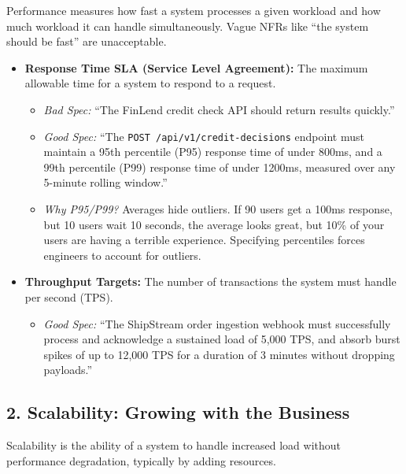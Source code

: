 \documentclass[
  11pt,
  openany,
  oneside]{book}
\providecommand{\tightlist}{%
  \setlength{\itemsep}{0pt}\setlength{\parskip}{0pt}}
\begin{document}
Performance measures how fast a system processes a given workload and
how much workload it can handle simultaneously. Vague NFRs like ``the
system should be fast'' are unacceptable.

\begin{itemize}
\tightlist
\item
  \textbf{Response Time SLA (Service Level Agreement):} The maximum
  allowable time for a system to respond to a request.

  \begin{itemize}
  \tightlist
  \item
    \emph{Bad Spec:} ``The FinLend credit check API should return
    results quickly.''
  \item
    \emph{Good Spec:} ``The \texttt{POST\ /api/v1/credit-decisions}
    endpoint must maintain a 95th percentile (P95) response time of
    under 800ms, and a 99th percentile (P99) response time of under
    1200ms, measured over any 5-minute rolling window.''
  \item
    \emph{Why P95/P99?} Averages hide outliers. If 90 users get a 100ms
    response, but 10 users wait 10 seconds, the average looks great, but
    10\% of your users are having a terrible experience. Specifying
    percentiles forces engineers to account for outliers.
  \end{itemize}
\item
  \textbf{Throughput Targets:} The number of transactions the system
  must handle per second (TPS).

  \begin{itemize}
  \tightlist
  \item
    \emph{Good Spec:} ``The ShipStream order ingestion webhook must
    successfully process and acknowledge a sustained load of 5,000 TPS,
    and absorb burst spikes of up to 12,000 TPS for a duration of 3
    minutes without dropping payloads.''
  \end{itemize}
\end{itemize}

\subsection{2. Scalability: Growing with the
Business}\label{scalability-growing-with-the-business}

Scalability is the ability of a system to handle increased load without
performance degradation, typically by adding resources.
\end{document}
